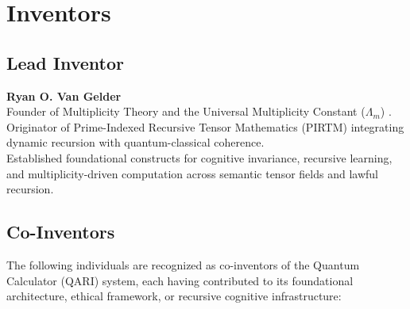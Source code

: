 \documentclass[12pt]{article}
\begin{document}
\section*{Inventors}

\subsection*{Lead Inventor} 
\textbf{Ryan O. Van Gelder}\\
Founder of Multiplicity Theory and the Universal Multiplicity Constant ($\Lambda_m$) \cite{multiplicity2025}.\\
Originator of Prime-Indexed Recursive Tensor Mathematics (PIRTM) integrating dynamic recursion with quantum-classical coherence.\\
Established foundational constructs for cognitive invariance, recursive learning, and multiplicity-driven computation across semantic tensor fields and lawful recursion.

\subsection*{Co-Inventors}    
The following individuals are recognized as co-inventors of the Quantum Calculator (QARI) system, each having contributed to its foundational architecture, ethical framework, or recursive cognitive infrastructure:
\end{document}
